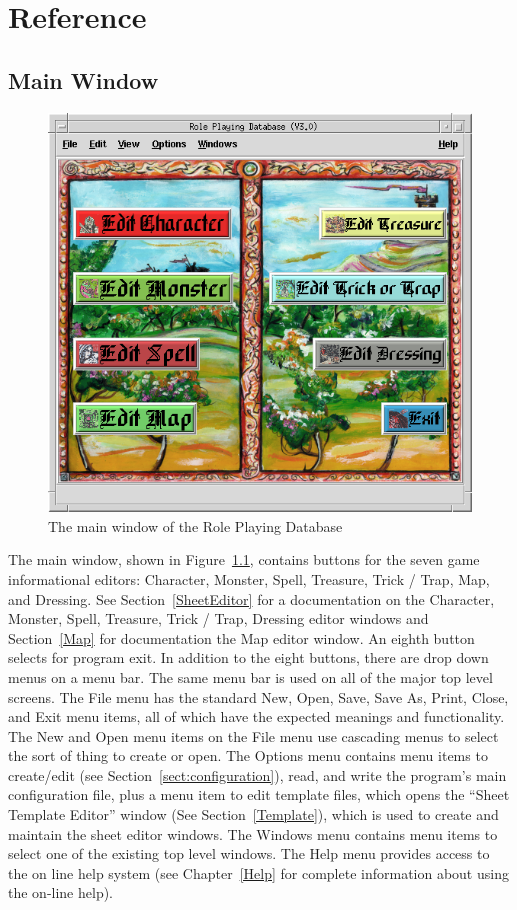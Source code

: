 \chapter{Reference}
\label{Reference}

\section{Main Window}
\label{Main}

\begin{figure}[hbpt] \begin{centering}
\includegraphics[width=5in]{MainWindow.png} \caption{The main window of
the Role Playing Database} \label{fig:main} \end{centering}
\end{figure} The main window, shown in Figure~\ref{fig:main}, contains
buttons for the seven game informational editors: Character, Monster,
Spell, Treasure, Trick / Trap, Map, and Dressing.  See
Section~\ref{SheetEditor} for a documentation on the Character,
Monster, Spell, Treasure, Trick / Trap, Dressing editor windows and
Section~\ref{Map} for documentation the Map editor window. An eighth
button selects for program exit. In addition to the eight buttons,
there are drop down menus on a menu bar.  The same menu bar is used on
all of the major top level screens.  The File menu has the standard
New, Open, Save, Save As, Print, Close, and Exit menu items, all of
which have the expected meanings and functionality.  The New and Open
menu items on the File menu use cascading menus to select the sort of
thing to create or open.  The Options menu contains menu items to
create/edit (see Section~\ref{sect:configuration}), read, and write the
program's main configuration file, plus a menu item to edit template
files, which opens the ``Sheet Template Editor'' window (See
Section~\ref{Template}), which is used to create and maintain the sheet
editor windows.  The Windows menu contains menu items to select one of
the existing top level windows. The Help menu provides access to the
on line help system (see Chapter~\ref{Help} for complete information
about using the on-line help).

